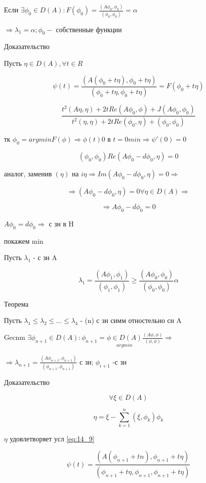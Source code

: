 \documentclass[12pt, a4paper]{article}
\begin{document}
Если $ \exists \phi_0 \in D(A): F(\phi_0) = \frac{(A \phi_0, \phi_0)}{(\phi_0, \phi_0)} = \alpha$

$ \Rightarrow \lambda_1 = \alpha; \phi_0 -$ собственные функции

Доказательство

Пусть $ \eta \in D(A), \forall t \in R $

\[ \psi(t) = \frac{(A(\phi_0 + t \eta), \phi_0 + t\eta)}{(\phi_0 + t \eta, \phi_0 + t\eta)} = F(\phi_0 + t \eta) \]

\[ \frac{t^2(A \eta, \eta) + 2 t Re(A \phi_0, \phi) + J(A \phi_0, \phi_0)}{t^2 (\eta, \eta) + 2tRe(\phi_0, \eta) + (\phi_0, \phi_0)} \]

тк $ \phi_0 = argmin F(\phi) \Rightarrow \phi(t)0  $ в $ t=0 min \Rightarrow \psi'(0) = 0 $

\[ (\phi_0, \phi_0) Re (A \phi_0 - d\phi_0, \eta) = 0 \]

аналог, заменив $ (\eta) $ на $ i\eta  \Rightarrow Im (A \phi_0 - d\phi_0, \eta) = 0 \Rightarrow$

\[ \Rightarrow (A \phi_0 - d \phi_0, \eta) = 0 \forall \eta \in D(A) \Rightarrow \]

\[ \Rightarrow A \phi_0 - d \phi_0 = 0 \]

$ A \phi_0 = d \phi_0 \Rightarrow $ с зн в H

покажем min

Пусть $ \lambda_1 $ - с зн A

\[ \lambda_1 = \frac{(A \phi_1, \phi_1)}{(\phi_1, \phi_1)} \geq \frac{(A \phi_0, \phi_0)}{(\phi_0, \phi_0)} \alpha \]

Теорема

Пусть $ \lambda_1 \leq \lambda_2 \leq ... \leq \lambda_4 $ - (n) с зн симм отностельно сн A

Gecnm $ \exists \phi_{n+1} \in D(A): \phi_{n+1}= \underset{argmin}{\phi \in D(A)} \frac{(A \phi, \phi)}{(\phi, \phi)} \Rightarrow $

$ \Rightarrow \lambda_{n+1} = \frac{(A \phi_{n+1}, \phi_{n+1})}{(\phi_{n+1}, \phi_{n+1})} $ с зн; $ \phi_{i+1} $ -с зн

Доказательство

\[ \forall \xi \in D(A) \]

\[ \eta = \xi - \sum_{k=1}^{n} (\xi, \phi_k) \phi_k \]

$ \eta $ удовлетворяет усл \ref{eq:14_9}

\[ \psi(t) = \frac{(A(\phi_{n+1}+tn), \phi_{n+1}+t\eta)}{(\phi_{n+1}+t\eta, \phi_{n+1}, \phi_{n+1} + t\eta)} \]
\end{document}
